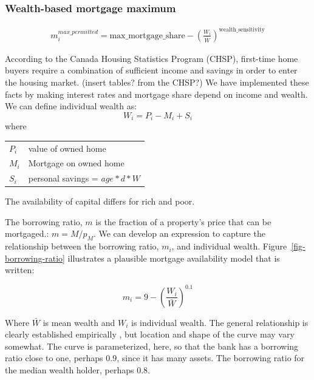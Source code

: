 {\subsubsection{Wealth-based mortgage maximum} 
\begin{align}
m_i^{max\_permitted} = \mathrm{max\_mortgage\_share} - \left(\frac{W_i}{\bar W}\right)^{\mathrm{wealth\_sensitivity}} \label{eqn-wealth-based-mortgage}    
\end{align} 


According to the Canada Housing Statistics Program (CHSP), first-time home buyers require a combination of sufficient income and savings in order to enter the housing market. (insert tables? from the CHSP?) We have implemented these facts by making interest rates and mortgage share depend on income and wealth.
We can define individual wealth as:
\[W_i= P_i -M_i  +S_i\]
where 

\begin{tabular}{ll}
$P_i$ & value of owned home\\
$M_i$ & Mortgage on owned home\\
$S_i$ & personal savings = $age*d*W$\\
\end{tabular}

The availability of capital differs for rich and poor. 

The borrowing ratio, $m$ is the fraction of a property's price that can be mortgaged.: $m=M/p_M$. We can develop an expression to capture the relationship between the \gls{borrowing ratio}, $m_i$,  and individual wealth. Figure~\ref{fig-borrowing-ratio} illustrates a plausible mortgage availability  model that is written:

 \[ m_i = 9-\left(\frac{W_i}{\bar W}\right)^{0.1} \]

 
Where $\bar{W}$ is mean wealth and $W_i$ is individual wealth. 
The general relationship is clearly established empirically \cite{}, but location and shape of the curve may vary somewhat. The curve is parameterized, here, so that the bank has a borrowing ratio close to one, perhaps 0.9, since it has many assets. The borrowing ratio for the median wealth holder, perhaps 0.8.


}
